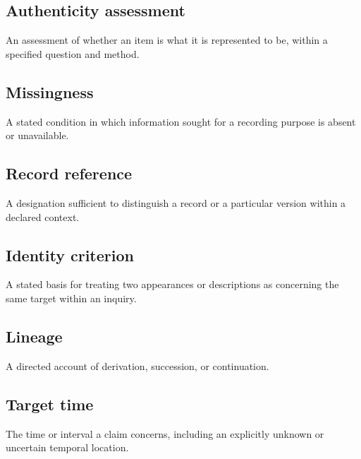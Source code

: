 \documentclass[11pt,a4paper]{article}
\begin{document}
\subsection{Authenticity assessment}
An assessment of whether an item is what it is represented to be, within a specified question and method.

\subsection{Missingness}
A stated condition in which information sought for a recording purpose is absent or unavailable.

\subsection{Record reference}
A designation sufficient to distinguish a record or a particular version within a declared context.

\subsection{Identity criterion}
A stated basis for treating two appearances or descriptions as concerning the same target within an inquiry.

\subsection{Lineage}
A directed account of derivation, succession, or continuation.

\subsection{Target time}
The time or interval a claim concerns, including an explicitly unknown or uncertain temporal location.
\end{document}
